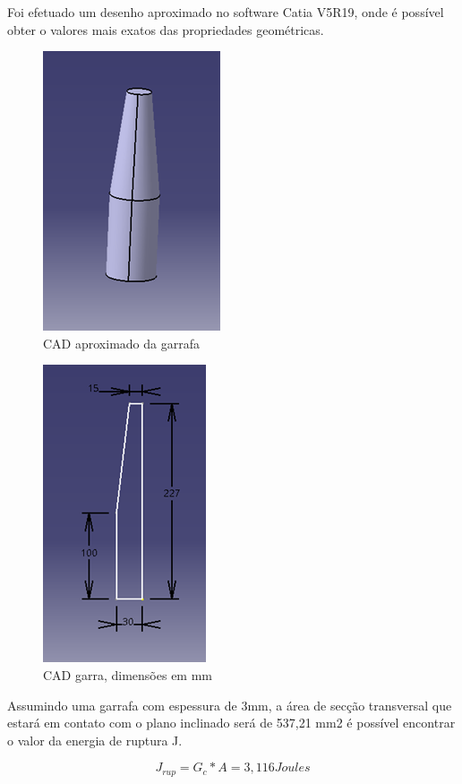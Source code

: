 Foi efetuado um desenho aproximado no software Catia V5R19, onde é possível obter o valores mais exatos das propriedades geométricas.

\begin{figure}[!h]
	\centering
		\includegraphics[scale=0.4]{figuras/estrutura/26.png}
	\caption{CAD aproximado da garrafa}
\end{figure}

\begin{figure}[!h]
	\centering
		\includegraphics[scale=0.4]{figuras/estrutura/27.png}
	\caption{CAD garra, dimensões em mm}
\end{figure}

Assumindo uma garrafa com espessura de 3mm, a área de secção transversal que estará em contato com o plano inclinado será de 537,21 mm2 é possível encontrar o valor da energia de ruptura J.

\begin{equation}
    J_{rup} = G_{c} \ast A = 3,116 Joules
\end{equation}

